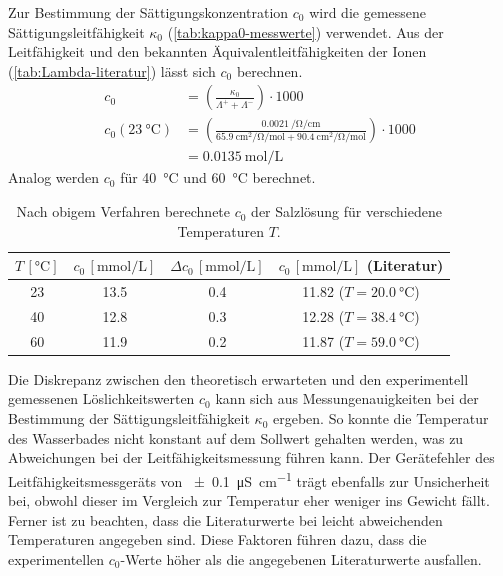 Zur Bestimmung der Sättigungskonzentration $c_0$ wird die gemessene Sättigungsleitfähigkeit $\kappa_0$ (\autoref{tab:kappa0-messwerte}) verwendet.
Aus der Leitfähigkeit und den bekannten Äquivalentleitfähigkeiten der Ionen (\autoref{tab:Lambda-literatur}) lässt sich $c_0$ berechnen.
\begin{align}
    c_0 &= \left( \frac{\kappa_0}{\Lambda^+ + \Lambda^-} \right) \cdot 1000 \label{eqn:sättigungskonzentration} \\
    c_0(\qty{23}{\degreeCelsius}) &= \left( \frac{\qty{0.0021}{\per\ohm\per\centi\meter}}{\qty{65.9}{\centi\meter\squared\per\ohm\per\mol} + \qty{90.4}{\centi\meter\squared\per\ohm\per\mol}} \right) \cdot 1000 \nonumber \\
                                 &= \qty{0.0135}{\mol\per\liter} \nonumber
\end{align}
Analog werden $c_0$ für \qty{40}{\degreeCelsius} und \qty{60}{\degreeCelsius} berechnet.
\begin{table}[H]
    \centering
    \caption{Nach obigem Verfahren berechnete $c_0$ der Salzlösung für verschiedene Temperaturen $T$.}
    \begin{tabular}{c c c c}
    \toprule
        $T\, [\unit{\degreeCelsius}]$ & $c_0\, [\unit{\milli\mol\per\liter}]$ & $\Delta c_0\, [\unit{\milli\mol\per\liter}]$ & $c_{0}\, [\unit{\milli\mol\per\liter}]$ (Literatur) \\ \midrule
        23 & 13.5 & \pm{} 0.4 & 11.82 ($T = \qty{20.0}{\degreeCelsius}$)\autocite{Raupenstrauch1885-ng}\\ \midrule
        40 & 12.8 & \pm{} 0.3 & 12.28 ($T = \qty{38.4}{\degreeCelsius}$)\autocite{Raupenstrauch1885-ng} \\ \midrule
        60 & 11.9 & \pm{} 0.2 & 11.87 ($T = \qty{59.0}{\degreeCelsius}$)\autocite{Raupenstrauch1885-ng} \\
    \bottomrule
    \end{tabular}
\end{table}
Die Diskrepanz zwischen den theoretisch erwarteten und den experimentell gemessenen Löslichkeitswerten $c_0$ kann sich aus Messungenauigkeiten bei der Bestimmung der Sättigungsleitfähigkeit $\kappa_0$ ergeben.
So konnte die Temperatur des Wasserbades nicht konstant auf dem Sollwert gehalten werden, was zu Abweichungen bei der Leitfähigkeitsmessung führen kann.
Der Gerätefehler des Leitfähigkeitsmessgeräts von \qty{\pm 0.1}{\micro\siemens\per\cm} trägt ebenfalls zur Unsicherheit bei, obwohl dieser im Vergleich zur Temperatur eher weniger ins Gewicht fällt.
Ferner ist zu beachten, dass die Literaturwerte bei leicht abweichenden Temperaturen angegeben sind.
Diese Faktoren führen dazu, dass die experimentellen $c_0$-Werte höher als die angegebenen Literaturwerte ausfallen.


